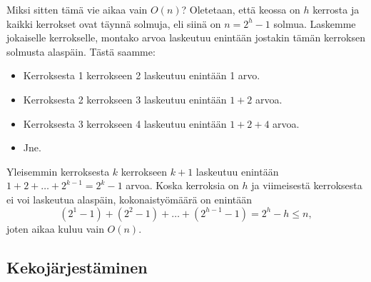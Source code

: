 Miksi sitten tämä vie aikaa vain $O(n)$?
Oletetaan, että keossa on $h$ kerrosta ja kaikki
kerrokset ovat täynnä solmuja, eli siinä on $n=2^h-1$ solmua.
Laskemme jokaiselle kerrokselle, montako arvoa laskeutuu
enintään jostakin tämän kerroksen solmusta alaspäin. Tästä saamme:

\begin{itemize}
\item Kerroksesta 1 kerrokseen 2 laskeutuu enintään 1 arvo.
\item Kerroksesta 2 kerrokseen 3 laskeutuu enintään $1+2$ arvoa.
\item Kerroksesta 3 kerrokseen 4 laskeutuu enintään $1+2+4$ arvoa.
\item Jne.
\end{itemize}

Yleisemmin kerroksesta $k$ kerrokseen $k+1$ laskeutuu
enintään $1+2+\dots+2^{k-1} = 2^k-1$ arvoa.
Koska kerroksia on $h$ ja viimeisestä kerroksesta ei voi laskeutua alaspäin,
kokonaistyömäärä on enintään
\[(2^1-1)+(2^2-1)+\dots+(2^{h-1}-1)=2^h-h \le n,\]
joten aikaa kuluu vain $O(n)$.

\subsection{Kekojärjestäminen}

